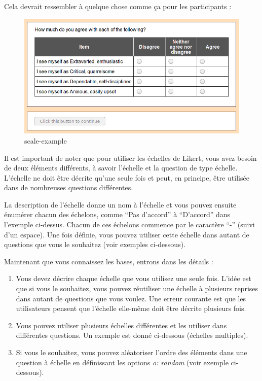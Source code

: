 \documentclass[
]{book}
\providecommand{\tightlist}{%
  \setlength{\itemsep}{0pt}\setlength{\parskip}{0pt}}
\begin{document}
Cela devrait ressembler à quelque chose comme ça pour les participants :

\begin{figure}
\centering
\includegraphics{img/scale-example.png}
\caption{scale-example}
\end{figure}

Il est important de noter que pour utiliser les échelles de Likert, vous avez besoin de deux éléments différents, à savoir l'échelle et la question de type échelle. L'échelle ne doit être décrite qu'une seule fois et peut, en principe, être utilisée dans de nombreuses questions différentes.

La description de l'échelle donne un nom à l'échelle et vous pouvez ensuite énumérer chacun des échelons, comme ``Pas d'accord'' à ``D'accord'' dans l'exemple ci-dessus. Chacun de ces échelons commence par le caractère ``-'' (suivi d'un espace). Une fois définie, vous pouvez utiliser cette échelle dans autant de questions que vous le souhaitez (voir exemples ci-dessous).

Maintenant que vous connaissez les bases, entrons dans les détails :

\begin{enumerate}
\def\labelenumi{\arabic{enumi}.}
\tightlist
\item
  Vous devez décrire chaque échelle que vous utilisez une seule fois. L'idée est que si vous le souhaitez, vous pouvez réutiliser une échelle à plusieurs reprises dans autant de questions que vous voulez. Une erreur courante est que les utilisateurs pensent que l'échelle elle-même doit être décrite plusieurs fois.
\item
  Vous pouvez utiliser plusieurs échelles différentes et les utiliser dans différentes questions. Un exemple est donné ci-dessous (échelles multiples).
\item
  Si vous le souhaitez, vous pouvez aléatoriser l'ordre des éléments dans une question à échelle en définissant les options \emph{o: random} (voir exemple ci-dessous).
\end{enumerate}
\end{document}
